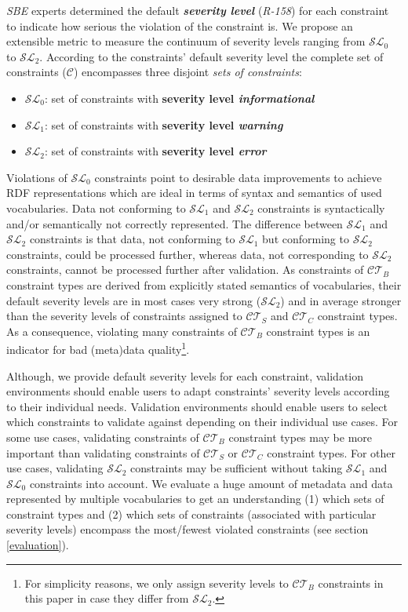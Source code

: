 \documentclass{llncs}
\begin{document}
{\emph{SBE} experts determined the default \textbf{\emph{severity level}} (\emph{R-158}) for each constraint to indicate how serious the violation of the constraint is.
We propose an extensible metric to measure the continuum of severity levels ranging from $\mathcal{SL}_{0}$ to $\mathcal{SL}_{2}$.
According to the constraints' default severity level the complete set of constraints ($\mathcal{C}$) encompasses three disjoint \emph{sets of constraints}:
\begin{itemize}
	\item $\mathcal{SL}_{0}$: set of constraints with \textbf{severity level \emph{informational}}
	\item $\mathcal{SL}_{1}$: set of constraints with \textbf{severity level \emph{warning}}
	\item $\mathcal{SL}_{2}$: set of constraints with \textbf{severity level \emph{error}}
\end{itemize}
Violations of $\mathcal{SL}_{0}$ constraints point to desirable data improvements to achieve RDF representations which are ideal in terms of syntax and semantics of used vocabularies. 
Data not conforming to $\mathcal{SL}_{1}$ and $\mathcal{SL}_{2}$ constraints is syntactically and/or semantically not correctly represented.
The difference between $\mathcal{SL}_{1}$ and $\mathcal{SL}_{2}$ constraints is that data, not conforming to $\mathcal{SL}_{1}$ but conforming to $\mathcal{SL}_{2}$ constraints, could be processed further,
whereas data, not corresponding to $\mathcal{SL}_{2}$ constraints, cannot be processed further after validation. 
As constraints of $\mathcal{CT}_{B}$ constraint types are derived from explicitly stated semantics of vocabularies, 
their default severity levels are in most cases very strong ($\mathcal{SL}_{2}$) and 
in average stronger than the severity levels of constraints assigned to $\mathcal{CT}_{S}$ and $\mathcal{CT}_{C}$ constraint types.
As a consequence, violating many constraints of $\mathcal{CT}_{B}$ constraint types is an indicator for bad (meta)data quality\footnote{For simplicity reasons, we only assign severity levels to $\mathcal{CT}_{B}$ constraints in this paper in case they differ from $\mathcal{SL}_{2}$.}.

Although, we provide default severity levels for each constraint, validation environments should enable users to adapt constraints' severity levels according to their individual needs.
Validation environments should enable users to select which constraints to validate against depending on their individual use cases.
For some use cases, 
validating constraints of $\mathcal{CT}_{B}$ constraint types may be more important than validating constraints of $\mathcal{CT}_{S}$ or $\mathcal{CT}_{C}$ constraint types.
For other use cases,
validating $\mathcal{SL}_{2}$ constraints may be sufficient without taking $\mathcal{SL}_{1}$ and $\mathcal{SL}_{0}$ constraints into account.
We evaluate a huge amount of metadata and data represented by multiple vocabularies to get an understanding 
(1) which sets of constraint types and 
(2) which sets of constraints (associated with particular severity levels) encompass the most/fewest violated constraints (see section \ref{evaluation}).

}
\end{document}
